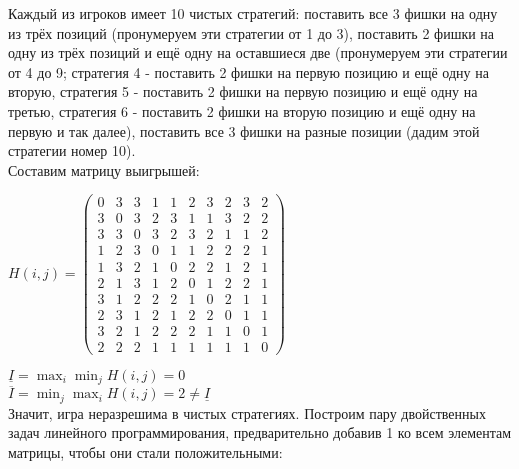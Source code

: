 \documentclass[a4paper,14pt]{extreport}
\begin{document}
\par{} \vskip 6pt
Каждый из игроков имеет 10 чистых стратегий: поставить все 3 фишки на одну из трёх позиций (пронумеруем эти стратегии от 1 до 3), поставить 2 фишки на одну из трёх позиций и ещё одну на оставшиеся две (пронумеруем эти стратегии от 4 до 9; стратегия 4 - поставить 2 фишки на первую позицию и ещё одну на вторую, стратегия 5 - поставить 2 фишки на первую позицию и ещё одну на третью, стратегия 6 - поставить 2 фишки на вторую позицию и ещё одну на первую и так далее), поставить все 3 фишки на разные позиции (дадим этой стратегии номер 10). \\Составим матрицу выигрышей:
\begin{center}
$H(i, j) =
 \begin{pmatrix}
  0 & 3 & 3 & 1 & 1 & 2 & 3 & 2 & 3 & 2 \\
  3 & 0 & 3 & 2 & 3 & 1 & 1 & 3 & 2 & 2 \\
  3 & 3 & 0 & 3 & 2 & 3 & 2 & 1 & 1 & 2 \\
  1 & 2 & 3 & 0 & 1 & 1 & 2 & 2 & 2 & 1 \\
  1 & 3 & 2 & 1 & 0 & 2 & 2 & 1 & 2 & 1 \\
  2 & 1 & 3 & 1 & 2 & 0 & 1 & 2 & 2 & 1 \\
  3 & 1 & 2 & 2 & 2 & 1 & 0 & 2 & 1 & 1 \\
  2 & 3 & 1 & 2 & 1 & 2 & 2 & 0 & 1 & 1 \\
  3 & 2 & 1 & 2 & 2 & 2 & 1 & 1 & 0 & 1 \\
  2 & 2 & 2 & 1 & 1 & 1 & 1 & 1 & 1 & 0
 \end{pmatrix}$
\end{center}
$\displaystyle\underline{I} = \max_{i}\min_{j}H(i, j) = 0$ \\
$\displaystyle\overline{I} = \min_{j}\max_{i}H(i, j) = 2 \neq \underline{I}$ \\
Значит, игра неразрешима в чистых стратегиях. Построим пару двойственных задач линейного программирования, предварительно добавив 1 ко всем элементам матрицы, чтобы они стали положительными: \\
\end{document}
